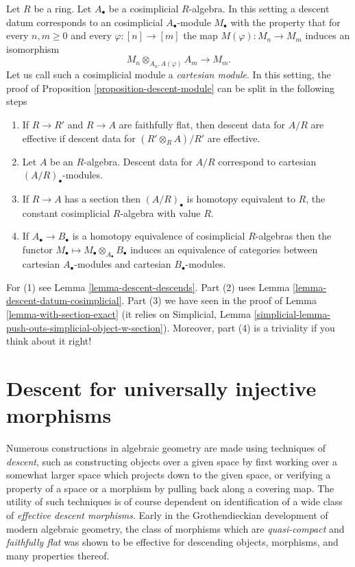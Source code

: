 \begin{remark}
\label{remark-homotopy-equivalent-cosimplicial-algebras}
Let $R$ be a ring. Let $A_\bullet$ be a cosimplicial $R$-algebra.
In this setting a descent datum corresponds to an cosimplicial
$A_\bullet$-module $M_\bullet$ with the property that for
every $n, m \geq 0$ and every $\varphi : [n] \to [m]$ the
map $M(\varphi) : M_n \to M_m$ induces an isomorphism
$$
M_n \otimes_{A_n, A(\varphi)} A_m \longrightarrow M_m.
$$
Let us call such a cosimplicial module a {\it cartesian module}.
In this setting, the proof of Proposition \ref{proposition-descent-module}
can be split in the following steps
\begin{enumerate}
\item If $R \to R'$ and $R \to A$ are faithfully flat,
then descent data for $A/R$ are effective if
descent data for $(R' \otimes_R A)/R'$ are effective.
\item Let $A$ be an $R$-algebra. Descent data for $A/R$ correspond
to cartesian $(A/R)_\bullet$-modules.
\item If $R \to A$ has a section then $(A/R)_\bullet$ is homotopy
equivalent to $R$, the constant cosimplicial
$R$-algebra with value $R$.
\item If $A_\bullet \to B_\bullet$ is a homotopy equivalence of
cosimplicial $R$-algebras then the functor
$M_\bullet \mapsto M_\bullet \otimes_{A_\bullet} B_\bullet$
induces an equivalence of categories between cartesian
$A_\bullet$-modules and cartesian $B_\bullet$-modules.
\end{enumerate}
For (1) see Lemma \ref{lemma-descent-descends}.
Part (2) uses Lemma \ref{lemma-descent-datum-cosimplicial}.
Part (3) we have seen in the proof of Lemma \ref{lemma-with-section-exact}
(it relies on Simplicial,
Lemma \ref{simplicial-lemma-push-outs-simplicial-object-w-section}).
Moreover, part (4) is a triviality if you think about it right!
\end{remark}








\section{Descent for universally injective morphisms}
\label{section-descent-universally-injective}

\noindent
Numerous constructions in algebraic geometry are made using techniques of 
{\it descent}, such as constructing objects over a given space by first
working over a somewhat larger space which projects down to the given space,
or verifying a property of a space or a morphism by pulling back along a
covering map. The utility of such techniques is of course  dependent on
identification of a wide class of {\it effective descent morphisms}.
Early in the Grothendieckian development of modern algebraic geometry,
the class of morphisms which are {\it quasi-compact} and {\it faithfully flat} 
was shown to be effective for descending objects, morphisms, and many
properties thereof. 

